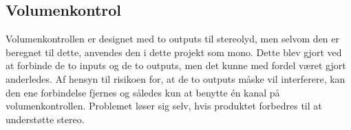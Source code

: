 \subsection{Volumenkontrol}
Volumenkontrollen er designet med to outputs til stereolyd, men selvom den er beregnet til dette, anvendes den i dette projekt som mono. Dette blev gjort ved at forbinde de to inputs og de to outputs, men det kunne med fordel været gjort anderledes. Af hensyn til risikoen for, at de to outputs måske vil interferere, kan den ene forbindelse fjernes og således kun at benytte én kanal på volumenkontrollen. Problemet løser sig selv, hvis produktet forbedres til at understøtte stereo. 



